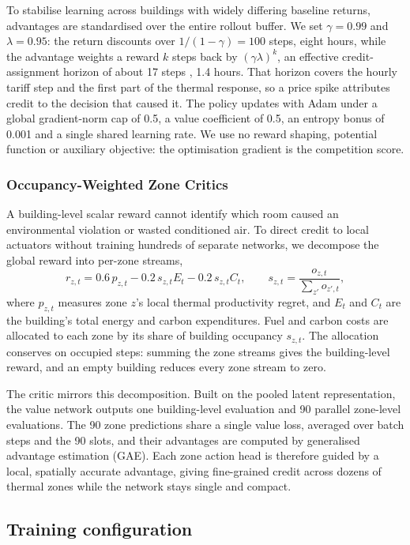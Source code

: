 \documentclass{article}
\begin{document}
To stabilise learning across buildings with widely differing baseline returns, advantages are standardised over the entire rollout buffer. We set $\gamma = 0.99$ and $\lambda = 0.95$: the return discounts over $1/(1-\gamma) = 100$ steps, eight hours, while the advantage weights a reward $k$ steps back by $(\gamma\lambda)^k$, an effective credit-assignment horizon of about 17 steps \citep{schulman2016gae}, 1.4 hours. That horizon covers the hourly tariff step and the first part of the thermal response, so a price spike attributes credit to the decision that caused it. The policy updates with Adam under a global gradient-norm cap of 0.5, a value coefficient of 0.5, an entropy bonus of 0.001 and a single shared learning rate. We use no reward shaping, potential function or auxiliary objective: the optimisation gradient is the competition score.

\subsubsection{Occupancy-Weighted Zone Critics}

A building-level scalar reward cannot identify which room caused an environmental violation or wasted conditioned air. To direct credit to local actuators without training hundreds of separate networks, we decompose the global reward into per-zone streams,
\[
r_{z,t} = 0.6\,p_{z,t} - 0.2\,s_{z,t}E_t - 0.2\,s_{z,t}C_t, \qquad s_{z,t} = \frac{o_{z,t}}{\sum_{z'} o_{z',t}},
\]
where $p_{z,t}$ measures zone $z$'s local thermal productivity regret, and $E_t$ and $C_t$ are the building's total energy and carbon expenditures. Fuel and carbon costs are allocated to each zone by its share of building occupancy $s_{z,t}$. The allocation conserves on occupied steps: summing the zone streams gives the building-level reward, and an empty building reduces every zone stream to zero.

The critic mirrors this decomposition. Built on the pooled latent representation, the value network outputs one building-level evaluation and 90 parallel zone-level evaluations. The 90 zone predictions share a single value loss, averaged over batch steps and the 90 slots, and their advantages are computed by generalised advantage estimation (GAE). Each zone action head is therefore guided by a local, spatially accurate advantage, giving fine-grained credit across dozens of thermal zones while the network stays single and compact.

\subsection{Training configuration}
\end{document}
